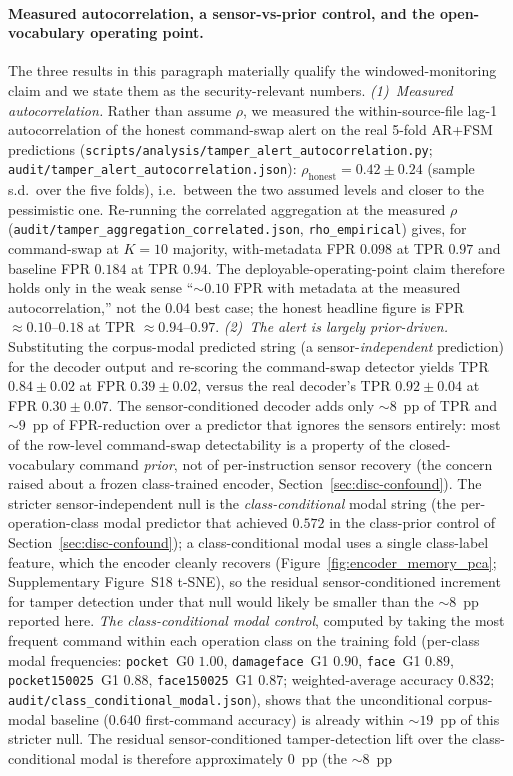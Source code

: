 \documentclass[sensors,article,submit,moreauthors,pdftex]{Definitions/mdpi}
\begin{document}
\paragraph{Measured autocorrelation, a sensor-vs-prior control, and the open-vocabulary operating point.} The three results in this paragraph materially qualify the windowed-monitoring claim and we state them as the security-relevant numbers. \emph{(1)~Measured autocorrelation.} Rather than assume $\rho$, we measured the within-source-file lag-1 autocorrelation of the honest command-swap alert on the real 5-fold AR+FSM predictions (\texttt{scripts/analysis/tamper\_alert\_autocorrelation.py}; \texttt{audit/tamper\_alert\_autocorrelation.json}): $\rho_{\text{honest}} = 0.42 \pm 0.24$ (sample s.d.\ over the five folds), i.e.\ between the two assumed levels and closer to the pessimistic one. Re-running the correlated aggregation at the measured $\rho$ (\texttt{audit/tamper\_aggregation\_correlated.json}, \texttt{rho\_empirical}) gives, for command-swap at $K=10$ majority, with-metadata FPR $0.098$ at TPR $0.97$ and baseline FPR $0.184$ at TPR $0.94$. The deployable-operating-point claim therefore holds only in the weak sense ``$\sim\!0.10$ FPR with metadata at the measured autocorrelation,'' not the $0.04$ best case; the honest headline figure is FPR $\approx 0.10$--$0.18$ at TPR $\approx 0.94$--$0.97$. \emph{(2)~The alert is largely prior-driven.} Substituting the corpus-modal predicted string (a sensor-\emph{independent} prediction) for the decoder output and re-scoring the command-swap detector yields TPR $0.84 \pm 0.02$ at FPR $0.39 \pm 0.02$, versus the real decoder's TPR $0.92 \pm 0.04$ at FPR $0.30 \pm 0.07$. The sensor-conditioned decoder adds only $\sim\!8$~pp of TPR and $\sim\!9$~pp of FPR-reduction over a predictor that ignores the sensors entirely: most of the row-level command-swap detectability is a property of the closed-vocabulary command \emph{prior}, not of per-instruction sensor recovery (the concern raised about a frozen class-trained encoder, Section~\ref{sec:disc-confound}). The stricter sensor-independent null is the \emph{class-conditional} modal string (the per-operation-class modal predictor that achieved $0.572$ in the class-prior control of Section~\ref{sec:disc-confound}); a class-conditional modal uses a single class-label feature, which the encoder cleanly recovers (Figure~\ref{fig:encoder_memory_pca}; Supplementary Figure~S18 t-SNE), so the residual sensor-conditioned increment for tamper detection under that null would likely be smaller than the $\sim\!8$~pp reported here. \emph{The class-conditional modal control}, computed by taking the most frequent command within each operation class on the training fold (per-class modal frequencies: \texttt{pocket}~G0 $1.00$, \texttt{damageface}~G1 $0.90$, \texttt{face}~G1 $0.89$, \texttt{pocket150025}~G1 $0.88$, \texttt{face150025}~G1 $0.87$; weighted-average accuracy $0.832$; \texttt{audit/class\_conditional\_modal.json}), shows that the unconditional corpus-modal baseline ($0.640$ first-command accuracy) is already within $\sim\!19$~pp of this stricter null. The residual sensor-conditioned tamper-detection lift over the class-conditional modal is therefore approximately $0$~pp (the $\sim\!8$~pp 
\end{document}
